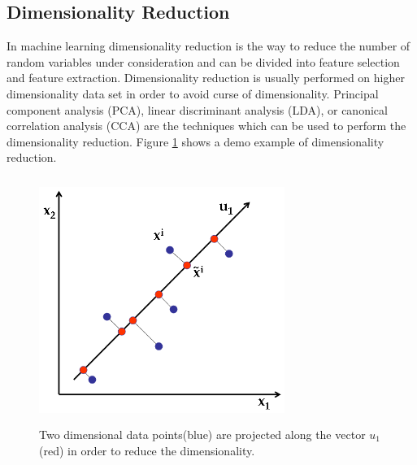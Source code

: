 \subsection{Dimensionality Reduction}
In machine learning dimensionality reduction is the way to reduce the number of random variables under consideration and can be divided into feature selection and feature extraction. Dimensionality reduction is usually performed on higher dimensionality data set in order to avoid curse of dimensionality. Principal component analysis (PCA), linear discriminant analysis (LDA), or canonical correlation analysis (CCA) are
the techniques which can be used to perform the dimensionality reduction.
Figure \ref{fig:pca_dimen} shows a demo example of dimensionality reduction.
\begin{figure}
\centering
\includegraphics[width=8cm,height=8cm]{figures/pca_example.png}
\caption{Two dimensional data points(blue) are projected along the vector $u_1$(red) in order to reduce the dimensionality.}
\label{fig:pca_dimen}
\end{figure}
 

